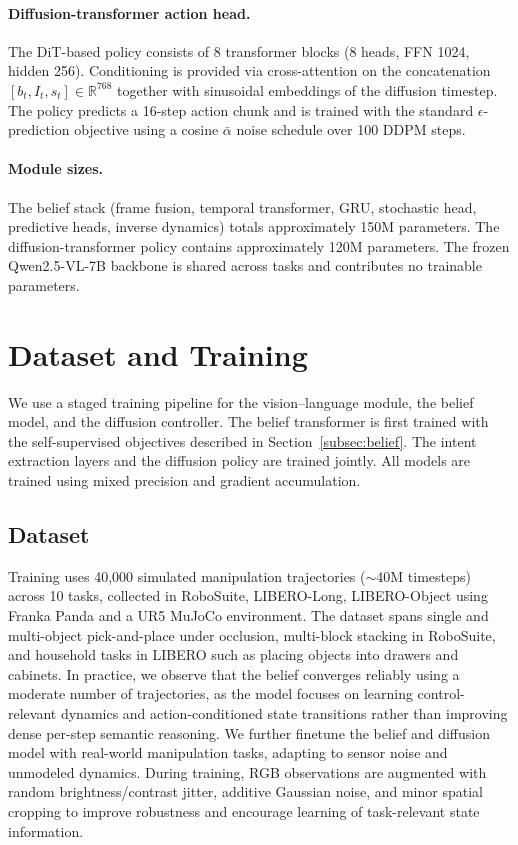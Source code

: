 \documentclass[12pt]{article}
\begin{document}
\paragraph{Diffusion-transformer action head.} The DiT-based policy consists of 8 transformer blocks (8 heads, FFN 1024, hidden 256). Conditioning is provided via cross-attention on the concatenation $[b_t, I_t, s_t] \in \mathbb{R}^{768}$ together with sinusoidal embeddings of the diffusion timestep. The policy predicts a 16-step action chunk and is trained with the standard $\epsilon$-prediction objective using a cosine $\bar{\alpha}$ noise schedule over 100 DDPM steps.

\paragraph{Module sizes.} The belief stack (frame fusion, temporal transformer, GRU, stochastic head, predictive heads, inverse dynamics) totals approximately 150M parameters. The diffusion-transformer policy contains approximately 120M parameters. The frozen Qwen2.5-VL-7B backbone is shared across tasks and contributes no trainable parameters.

\section{Dataset and Training}
We use a staged training pipeline for the vision--language module, the belief model, and the diffusion controller. The belief transformer is first trained with the self-supervised objectives described in Section~\ref{subsec:belief}. The intent extraction layers and the diffusion policy are trained jointly. All models are trained using mixed precision and gradient accumulation.

\subsection{Dataset}
Training uses 40{,}000 simulated manipulation trajectories ($\sim$40M timesteps) across 10 tasks, collected in RoboSuite, LIBERO-Long, LIBERO-Object using Franka Panda and a UR5 MuJoCo environment. The dataset spans single and multi-object pick-and-place under occlusion, multi-block stacking in RoboSuite, and household tasks in LIBERO such as placing objects into drawers and cabinets. In practice, we observe that the belief converges reliably using a moderate number of trajectories, as the model focuses on learning control-relevant dynamics and action-conditioned state transitions rather than improving dense per-step semantic reasoning. We further finetune the belief and diffusion model with real-world manipulation tasks, adapting to sensor noise and unmodeled dynamics. During training, RGB observations are augmented with random brightness/contrast jitter, additive Gaussian noise, and minor spatial cropping to improve robustness and encourage learning of task-relevant state information.
\end{document}
